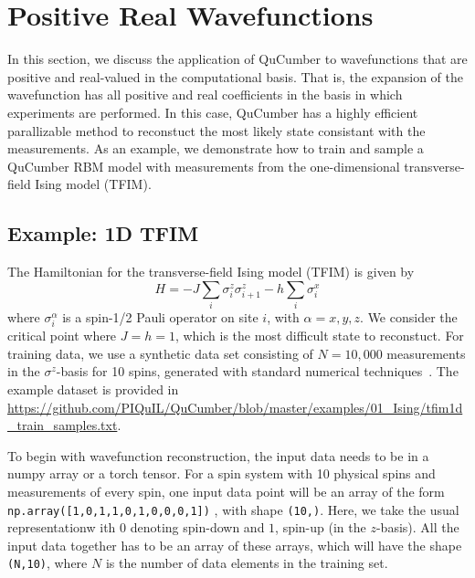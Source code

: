 \documentclass[submission, Phys]{SciPost}
\begin{document}
\section{Positive Real Wavefunctions}

In this section, we discuss the application of QuCumber to wavefunctions that are positive and real-valued in the computational basis.
That is, the expansion of the wavefunction has all positive and real coefficients in the basis in which experiments are performed.
In this case, QuCumber has a highly efficient parallizable method to reconstuct the most likely state consistant with the measurements.
As an example, we demonstrate how to train and sample a QuCumber RBM model with measurements from the one-dimensional transverse-field Ising model (TFIM).




\subsection{Example: 1D TFIM}
\label{Sec:Training_TFIM}

The Hamiltonian for the transverse-field Ising model (TFIM) is given by
\begin{equation}
	H = -J\sum_i \sigma^z_i \sigma^z_{i+1} - h \sum_i \sigma^x_i \label{TFIM}
\end{equation}
where $\sigma^{\alpha}_i$ is a spin-1/2 Pauli operator on site $i$, with $\alpha=x,y,z$. We consider the critical point where $J=h=1$, which is the most difficult state to reconstuct.
For training data, we use a synthetic data set consisting of $N=10,000$ measurements in the $\sigma^z$-basis for 10 spins, generated with standard numerical techniques~\cite{itensor}.
The example dataset is provided in \url{https://github.com/PIQuIL/QuCumber/blob/master/examples/01_Ising/tfim1d_train_samples.txt}.

To begin with wavefunction reconstruction, the input data needs to be in a numpy array or a torch tensor.
For a spin system with 10 physical spins and measurements of every spin, one input data point will be an array of the form
\verb|np.array([1,0,1,1,0,1,0,0,0,1])|
, with shape \verb|(10,)|.
Here, we take the usual representationw ith $0$ denoting spin-down and $1$, spin-up (in the $z$-basis).
All the input data together has to be an array of these arrays, which will have the shape \verb|(N,10)|, where $N$ is the number of data elements in the training set.
\end{document}
